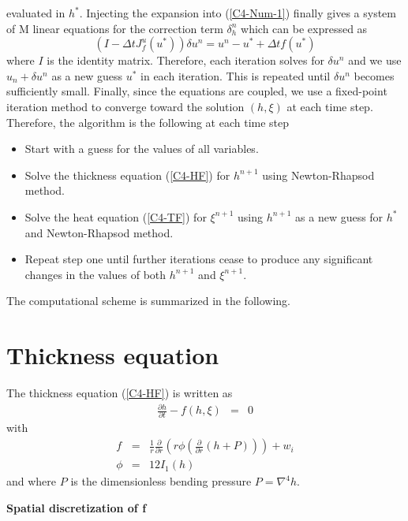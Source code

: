evaluated  in $h^*$.   Injecting the  expansion into  (\ref{C4-Num-1})
finally gives a  system of M linear equations for  the correction term
$\delta_h^n$ which can be expressed as
\begin{equation}
  (I-\Delta tJ^u_{f}(u^*))\delta u^n=u^n-u^*+\Delta t f(u^*)
\end{equation}
where $I$ is the identity matrix. Therefore, each iteration solves for
$\delta u^n$ and we use $u_n+\delta u^n$  as a new guess $u^*$ in each
iteration. This  is repeated  until $\delta u^n$  becomes sufficiently
small.  Finally, since the equations are coupled, we use a fixed-point
iteration method  to converge  toward the  solution $(h,\xi)$  at each
time step.   Therefore, the  algorithm is the  following at  each time
step
\begin{itemize}
\item Start with a guess for the values of all variables.
\item Solve  the thickness equation (\ref{C4-HF})  for $h^{n+1}$ using
  Newton-Rhapsod method.
\item  Solve the  heat  equation (\ref{C4-TF})  for $\xi^{n+1}$  using
  $h^{n+1}$ as a new guess for $h^*$ and Newton-Rhapsod method.
\item Repeat  step one until  further iterations cease to  produce any
  significant changes in the values of both $h^{n+1}$ and $\xi^{n+1}$.
\end{itemize}
The computational scheme is summarized in the following.

\section{Thickness equation}

The thickness equation (\ref{C4-HF}) is written as
\begin{eqnarray}
  \frac{\partial h}{\partial t}-f(h,\xi)&=&0
\end{eqnarray}
with
\begin{eqnarray}
  f& =& \frac{1}{r}
        \frac{\partial}{\partial      r}
        \left(      r  \phi\left(     \frac{\partial      }{\partial
        r}\left(h+P\right)\right)\right)+w_i\\
  \phi &=& 12I_1(h)
\end{eqnarray}
and where $P$ is the dimensionless bending pressure $P = \nabla^4h$.

\vspace{.5cm} \textbf{Spatial discretization of f} \vspace{.5cm}

